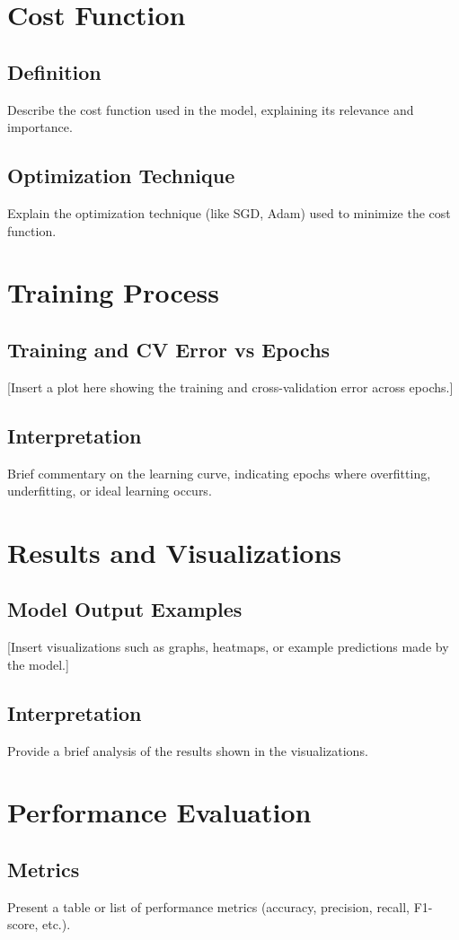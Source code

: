\documentclass{article}
\begin{document}
\section{Cost Function}
\subsection{Definition}
Describe the cost function used in the model, explaining its relevance and importance.
\subsection{Optimization Technique}
Explain the optimization technique (like SGD, Adam) used to minimize the cost function.

\section{Training Process}
\subsection{Training and CV Error vs Epochs}
[Insert a plot here showing the training and cross-validation error across epochs.]
\subsection{Interpretation}
Brief commentary on the learning curve, indicating epochs where overfitting, underfitting, or ideal learning occurs.

\section{Results and Visualizations}
\subsection{Model Output Examples}
[Insert visualizations such as graphs, heatmaps, or example predictions made by the model.]
\subsection{Interpretation}
Provide a brief analysis of the results shown in the visualizations.

\section{Performance Evaluation}
\subsection{Metrics}
Present a table or list of performance metrics (accuracy, precision, recall, F1-score, etc.).
\end{document}
